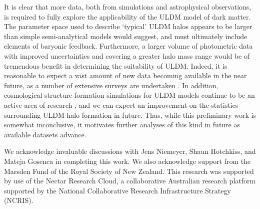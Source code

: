 \documentclass[a4paper,11pt]{article}
\begin{document}
It is clear that more data, both from simulations and astrophysical observations, is required to fully explore the applicability of the ULDM model of dark matter. The parameter space used to describe `typical' ULDM halos appears to be larger than simple semi-analytical models would suggest, and must ultimately include elements of baryonic feedback. Furthermore, a larger volume of photometric data with improved uncertainties and covering a greater halo mass range would be of tremendous benefit in determining the suitability of ULDM. Indeed, it is reasonable to expect a vast amount of new data becoming available in the near future, as a number of extensive surveys are undertaken \cite{Simon:2019kmm}. In addition, cosmological structure formation simulations for ULDM models continue to be an active area of research \cite{Lin:2018whl, Clough:2018exo, Mocz:2015sda}, and we can expect an improvement on the statistics surrounding ULDM halo formation in future. Thus, while this preliminary work is somewhat inconclusive, it motivates further analyses of this kind in future as available datasets advance. 




\acknowledgments

We acknowledge invaluable discussions with Jens Niemeyer, Shaun Hotchkiss, and Mateja Gosenca in completing this work. We also acknowledge support from the Marsden Fund of the Royal Society of New Zealand. This research was supported by use of the Nectar Research Cloud, a collaborative Australian research platform supported by the National Collaborative Research Infrastructure Strategy (NCRIS).






 
\end{document}
